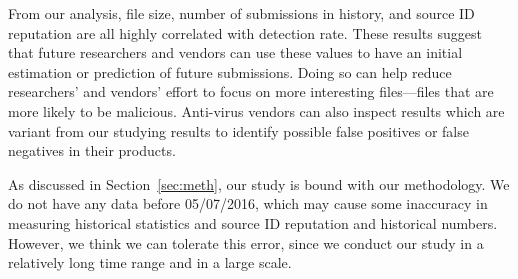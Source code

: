 From our analysis, file size, number of submissions in history, and source ID reputation
are all highly correlated with detection rate. 
These results suggest that future researchers and vendors can use these values to have an initial estimation or prediction of future submissions.
Doing so can help reduce researchers' and vendors' effort to focus on more interesting files---files that are more likely to be malicious.
Anti-virus vendors can also inspect results which are variant from our studying results 
to identify possible false positives or false negatives in their products. 


As discussed in Section~\ref{sec:meth}, our study is bound with our methodology.
We do not have any data before 05/07/2016, 
which may cause some inaccuracy in measuring historical statistics and 
source ID reputation and historical numbers.
However, we think we can tolerate this error, 
since we conduct our study in a relatively long time range and in a large scale. 
